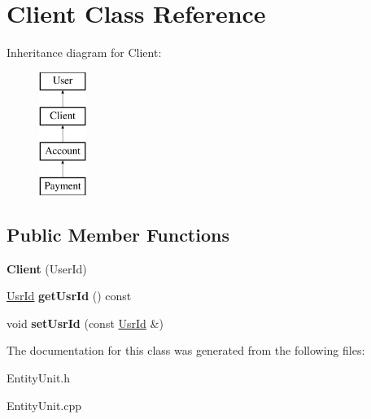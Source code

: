 \hypertarget{classClient}{\section{Client Class Reference}
\label{classClient}
}
Inheritance diagram for Client\-:\begin{figure}[H]
\begin{center}
\leavevmode
\includegraphics[height=4.000000cm]{classClient}
\end{center}
\end{figure}
\subsection*{Public Member Functions}
\begin{DoxyCompactItemize}
\item 
\hypertarget{classClient_a95824a725a8201a415d209723aa5f57e}{{\bfseries Client} (User\-Id)}\label{classClient_a95824a725a8201a415d209723aa5f57e}

\item 
\hypertarget{classClient_a09dc8dcdbf81070fc70fca225a3e1437}{\hyperlink{classUsrId}{Usr\-Id} {\bfseries get\-Usr\-Id} () const }\label{classClient_a09dc8dcdbf81070fc70fca225a3e1437}

\item 
\hypertarget{classClient_a50103c2fec3569d4f07a1dde49f1549d}{void {\bfseries set\-Usr\-Id} (const \hyperlink{classUsrId}{Usr\-Id} \&)}\label{classClient_a50103c2fec3569d4f07a1dde49f1549d}

\end{DoxyCompactItemize}


The documentation for this class was generated from the following files\-:\begin{DoxyCompactItemize}
\item 
Entity\-Unit.\-h\item 
Entity\-Unit.\-cpp\end{DoxyCompactItemize}
